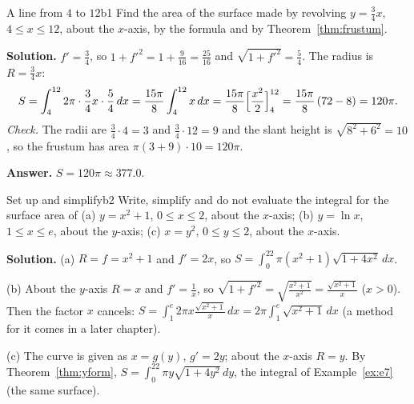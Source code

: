 \documentclass[11pt]{article}
\begin{document}
\begin{exmp}{A line from $4$ to $12$}{b1}
Find the area of the surface made by revolving $y=\frac34x$, $4\le x\le12$, about the $x$-axis, by the formula and by Theorem~\ref{thm:frustum}.

\textbf{Solution.} $f'=\frac34$, so $1+f'^2=1+\frac9{16}=\frac{25}{16}$ and $\sqrt{1+f'^2}=\frac54$. The radius is $R=\frac34x$:
\[
S=\int_4^{12}2\pi\cdot\frac34x\cdot\frac54\,dx=\frac{15\pi}8\int_4^{12}x\,dx=\frac{15\pi}8\Bigl[\frac{x^2}2\Bigr]_4^{12}=\frac{15\pi}8\,(72-8)=120\pi .
\]
\emph{Check.} The radii are $\frac34\cdot4=3$ and $\frac34\cdot12=9$ and the slant height is $\sqrt{8^2+6^2}=10$, so the frustum has area $\pi(3+9)\cdot10=120\pi$.

\textbf{Answer.} $S=120\pi\approx377.0$.
\end{exmp}

\begin{exmp}{Set up and simplify}{b2}
Write, simplify and do not evaluate the integral for the surface area of (a) $y=x^2+1$, $0\le x\le2$, about the $x$-axis; (b) $y=\ln x$, $1\le x\le e$, about the $y$-axis; (c) $x=y^2$, $0\le y\le2$, about the $x$-axis.

\textbf{Solution.} (a) $R=f=x^2+1$ and $f'=2x$, so $S=\int_0^22\pi(x^2+1)\sqrt{1+4x^2}\,dx$.

(b) About the $y$-axis $R=x$ and $f'=\frac1x$, so $\sqrt{1+f'^2}=\sqrt{\frac{x^2+1}{x^2}}=\frac{\sqrt{x^2+1}}x$ ($x>0$). Then the factor $x$ cancels: $S=\int_1^e2\pi x\frac{\sqrt{x^2+1}}x\,dx=2\pi\int_1^e\sqrt{x^2+1}\,dx$ (a method for it comes in a later chapter).

(c) The curve is given as $x=g(y)$, $g'=2y$; about the $x$-axis $R=y$. By Theorem~\ref{thm:yform}, $S=\int_0^22\pi y\sqrt{1+4y^2}\,dy$, the integral of Example~\ref{ex:e7} (the same surface).
\end{exmp}
\end{document}
